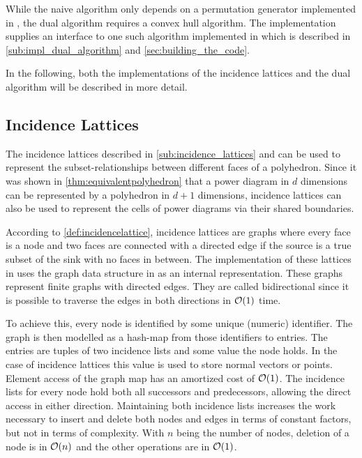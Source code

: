 While the naive algorithm only depends on a permutation generator implemented in , the dual algorithm requires a convex hull algorithm.
The implementation supplies an interface to one such algorithm implemented in  which is described in \cref{sub:impl_dual_algorithm} and \cref{sec:building_the_code}.

In the following, both the implementations of the incidence lattices and the dual algorithm will be described in more detail.

\subsection{Incidence Lattices}
\label{sub:impl_incidence_lattices}
The incidence lattices described in \cref{sub:incidence_lattices} and \cite{edelsbrunner1986constructing} can be used to represent the subset-relationships between different faces of a polyhedron.
Since it was shown in \cref{thm:equivalentpolyhedron} that a power diagram in $d$ dimensions can be represented by a polyhedron in $d+1$ dimensions, incidence lattices can also be used to represent the cells of power diagrams via their shared boundaries.

According to \cref{def:incidencelattice}, incidence lattices are graphs where every face is a node and two faces are connected with a directed edge if the source is a true subset of the sink with no faces in between.
The implementation of these lattices in  uses the graph data structure in  as an internal representation.
These graphs represent finite graphs with directed edges.
They are called bidirectional since it is possible to traverse the edges in both directions in $\mathcal{O}(1)$ time.

To achieve this, every node is identified by some unique (numeric) identifier.
The graph is then modelled as a hash-map from those identifiers to entries.
The entries are tuples of two incidence lists and some value the node holds.
In the case of incidence lattices this value is used to store normal vectors or points.
Element access of the graph map has an amortized cost of $\mathcal{O}(1)$.
The incidence lists for every node hold both all successors and predecessors, allowing the direct access in either direction.
Maintaining both incidence lists increases the work necessary to insert and delete both nodes and edges in terms of constant factors, but not in terms of complexity.
With $n$ being the number of nodes, deletion of a node is in $\mathcal{O}(n)$ and the other operations are in $\mathcal{O}(1)$.

